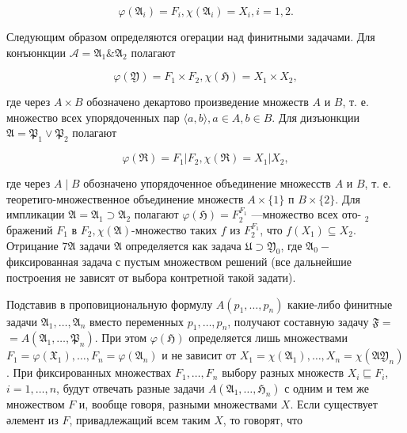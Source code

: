 \documentclass[10pt]{article}
\begin{document}
\[

\varphi\left(\mathfrak{A}_{i}\right)=F_{i}, \chi\left(\mathfrak{A}_{i}\right)=X_{i}, i=1,2 .

\]



Следующим образом определяются огерации над финитными задачами. Для конъюнкции $\mathfrak{\mathcal { A }}=\mathfrak{A}_{1} \& \mathfrak{A}_{2}$ полагают



\[

\varphi(\mathfrak{Y})=F_{1} \times F_{2}, \chi(\mathfrak{H})=X_{1} \times X_{2},

\]



где через $A \times B$ обозначено декартово произведение множеств $A$ и $B$, т. е. множество всех упорядоченных пар $\langle a, b\rangle, a \in A, b \in B$. Для дизъюнкции $\mathfrak{A}=\mathfrak{P}_{1} \vee \mathfrak{P}_{2}$ полагают



\[

\varphi(\mathfrak{R})=F_{1}\left|F_{2}, \chi(\mathfrak{R})=X_{1}\right| X_{2},

\]



где через $A \mid B$ обозначено упорядоченное объединение множесств $A$ и $B$, т. е. теоретиго-множественное объединение множеств $A \times\{1\}$ п $B \times\{2\}$. Для импликации $\mathfrak{A}=\mathfrak{A}_{1} \supset \mathfrak{A}_{2}$ полагают $\varphi(\mathfrak{H})=F_{2}^{F_{1}}$ —множество всех ото- $_{2}$ бражений $F_{1}$ в $F_{2}, \chi(\mathfrak{A})$-множество таких $f$ из $F_{2}^{F_{1}}$, что $f\left(X_{1}\right) \subseteq X_{2}$. Отрицание $7 \mathfrak{A}$ задачи $\mathfrak{A}$ определяется как задача $\mathfrak{U} \supset \mathfrak{Y}_{0}$, где $\mathfrak{A}_{0}-$ фиксированная задача с пустым множеством решений (все дальнейшие построения не зависят от выбора контретной такой задати).



Подставив в проповициональную формулу $A\left(p_{1}, \ldots, p_{n}\right)$ какие-либо финитные задачи $\mathfrak{A}_{1}, \ldots, \mathfrak{A}_{n}$ вместо переменных $p_{1}, \ldots, p_{n}$, получают составную задачу $\mathfrak{F}=$ $=A\left(\mathfrak{A}_{1}, \ldots, \mathfrak{P}_{n}\right)$. При этом $\varphi(\mathfrak{H})$ определяется лишь множествами $F_{1}=\varphi\left(\mathfrak{X}_{1}\right), \ldots, F_{n}=\varphi\left(\mathfrak{A}_{n}\right)$ и не зависит от $X_{1}=\chi\left(\mathfrak{A}_{1}\right), \ldots, X_{n}=\chi\left(\mathfrak{A} \mathfrak{Y}_{n}\right)$. При фиксированных множествах $F_{1}, \ldots, F_{n}$ выбору разных множеств $X_{i} \sqsubseteq F_{i}$, $i=1, \ldots, n$, будут отвечать разные задачи $A\left(\mathfrak{A}_{1}, \ldots, \mathfrak{H}_{n}\right)$ с одним и тем же множеством $F$ и, вообще говоря, разными множествами $X$. Если существует әлемент из $F$, привадлежащий всем таким $X$, то говорят, что
\end{document}
